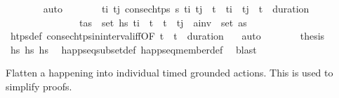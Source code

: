 \begin{isabellebody}
\ \ \ \ \ \ \isamarkupfalse%
\ auto\isanewline
\ \ \ \ \isamarkupfalse%
\ \isamarkupfalse%
\ {\isachardoublequoteopen}{\isasymforall}t\isactrlsub i\ t\isactrlsub j{\isachardot}{\kern0pt}\ {\isacharparenleft}{\kern0pt}consec{\isacharunderscore}{\kern0pt}htps\ {\isasympi}s\ t\isactrlsub i\ t\isactrlsub j\ {\isasymand}\ t\isactrlsub {\isasympi}\ {\isasymle}\ t\isactrlsub i\ {\isasymand}\ t\isactrlsub j\ {\isasymle}\ t\isactrlsub {\isasympi}\ {\isacharplus}{\kern0pt}\ {\isacharparenleft}{\kern0pt}duration\ {\isasympi}{\isacharparenright}{\kern0pt}{\isacharparenright}{\kern0pt}\ \isanewline
\ \ \ \ \ \ \ \ \ \ \ \ \ \ {\isasymlongrightarrow}\ {\isacharparenleft}{\kern0pt}{\isasymexists}{\isacharparenleft}{\kern0pt}t{\isacharprime}{\kern0pt}{\isacharcomma}{\kern0pt}as{\isacharparenright}{\kern0pt}\ {\isasymin}\ set\ hs{\isacharprime}{\kern0pt}{\isachardot}{\kern0pt}\ t\isactrlsub i\ {\isacharless}{\kern0pt}\ t{\isacharprime}{\kern0pt}\ {\isasymand}\ t{\isacharprime}{\kern0pt}\ {\isacharless}{\kern0pt}\ t\isactrlsub j\ {\isasymand}\ a\isactrlsub i\isactrlsub n\isactrlsub v\ {\isasymin}\ set\ as{\isacharparenright}{\kern0pt}{\isachardoublequoteclose}\isanewline
\ \ \ \ \ \ \isamarkupfalse%
\ htps{\isacharunderscore}{\kern0pt}def\ consec{\isacharunderscore}{\kern0pt}htps{\isacharunderscore}{\kern0pt}in{\isacharunderscore}{\kern0pt}interval{\isacharunderscore}{\kern0pt}iff{\isacharbrackleft}{\kern0pt}OF\ {\isacartoucheopen}t\isactrlsub {\isasympi}\ {\isasymle}\ t\isactrlsub {\isasympi}\ {\isacharplus}{\kern0pt}\ {\isacharparenleft}{\kern0pt}duration\ {\isasympi}{\isacharparenright}{\kern0pt}{\isacartoucheclose}{\isacharbrackright}{\kern0pt}\ \isamarkupfalse%
\ auto\isanewline
\ \ \ \ \isamarkupfalse%
\ \isamarkupfalse%
\ {\isacharquery}{\kern0pt}thesis\isanewline
\ \ \ \ \ \ \isamarkupfalse%
\ {\isacartoucheopen}hs{\isacharprime}{\kern0pt}\ {\isasymsubseteq}\isactrlsub h\isactrlsub s\ hs{\isacartoucheclose}\ \isamarkupfalse%
\ happ{\isacharunderscore}{\kern0pt}seq{\isacharunderscore}{\kern0pt}subset{\isacharunderscore}{\kern0pt}def\ happ{\isacharunderscore}{\kern0pt}seq{\isacharunderscore}{\kern0pt}member{\isacharunderscore}{\kern0pt}def\ \isamarkupfalse%
\ blast\isanewline
\ \ \isamarkupfalse%
%
\endisatagproof
{\isafoldproof}%
%
\isadelimproof
%
\endisadelimproof
%
\begin{isamarkuptext}%
Flatten a happening into individual timed grounded actions. This is used to simplify proofs.%

\end{isamarkuptext}
\end{isabellebody}
